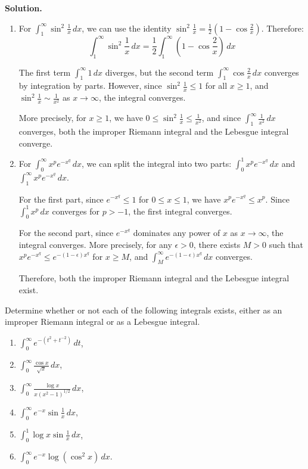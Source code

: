 \noindent\textbf{Solution.}
\begin{enumerate}[label=(\alph*)]
    \item For $\int_{1}^{\infty} \sin^2 \frac{1}{x} \, dx$, we can use the identity $\sin^2 \frac{1}{x} = \frac{1}{2}(1 - \cos \frac{2}{x})$. Therefore:
    \[\int_{1}^{\infty} \sin^2 \frac{1}{x} \, dx = \frac{1}{2} \int_{1}^{\infty} \left(1 - \cos \frac{2}{x}\right) \, dx\]
    
    The first term $\int_{1}^{\infty} 1 \, dx$ diverges, but the second term $\int_{1}^{\infty} \cos \frac{2}{x} \, dx$ converges by integration by parts. However, since $\sin^2 \frac{1}{x} \leq 1$ for all $x \geq 1$, and $\sin^2 \frac{1}{x} \sim \frac{1}{x^2}$ as $x \to \infty$, the integral converges.
    
    More precisely, for $x \geq 1$, we have $0 \leq \sin^2 \frac{1}{x} \leq \frac{1}{x^2}$, and since $\int_{1}^{\infty} \frac{1}{x^2} \, dx$ converges, both the improper Riemann integral and the Lebesgue integral converge.
    
    \item For $\int_{0}^{\infty} x^pe^{-x^q} \, dx$, we can split the integral into two parts: $\int_{0}^{1} x^pe^{-x^q} \, dx$ and $\int_{1}^{\infty} x^pe^{-x^q} \, dx$.
    
    For the first part, since $e^{-x^q} \leq 1$ for $0 \leq x \leq 1$, we have $x^pe^{-x^q} \leq x^p$. Since $\int_{0}^{1} x^p \, dx$ converges for $p > -1$, the first integral converges.
    
    For the second part, since $e^{-x^q}$ dominates any power of $x$ as $x \to \infty$, the integral converges. More precisely, for any $\epsilon > 0$, there exists $M > 0$ such that $x^pe^{-x^q} \leq e^{-(1-\epsilon)x^q}$ for $x \geq M$, and $\int_{M}^{\infty} e^{-(1-\epsilon)x^q} \, dx$ converges.
    
    Therefore, both the improper Riemann integral and the Lebesgue integral exist.
\end{enumerate}

\begin{problembox}
Determine whether or not each of the following integrals exists, either as an improper Riemann integral or as a Lebesgue integral.
\begin{enumerate}[label=(\alph*)]
    \item $\int_{0}^{\infty} e^{-(t^2 + t^{-2})} \, dt$,
    \item $\int_{0}^{\infty} \frac{\cos x}{\sqrt{x}} \, dx$,
    \item $\int_{0}^{\infty} \frac{\log x}{x(x^2 - 1)^{1/2}} \, dx$,
    \item $\int_{0}^{\infty} e^{-x} \sin \frac{1}{x} \, dx$,
    \item $\int_{0}^{1} \log x \sin \frac{1}{x} \, dx$,
    \item $\int_{0}^{\infty} e^{-x} \log (\cos^2 x) \, dx$.
\end{enumerate}
\end{problembox}

